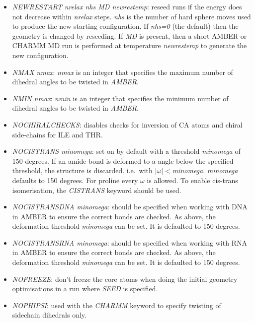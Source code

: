 \documentclass[12pt,a4paper,dvips]{article}
\begin{document}
\begin{itemize}
\item {\it NEWRESTART nrelax nhs MD newrestemp\/}: reseed runs if the energy does not decrease within {\it nrelax} steps.
{\it nhs} is the number of hard sphere moves used to produce the new starting configuration.
If {\it nhs=0} (the default) then the geometry is changed by reseeding. If {\it MD} is present, then a short AMBER or CHARMM MD run is performed at temperature {\it newrestemp} to generate the new configuration.

\item {\it NMAX nmax\/}: {\it nmax\/} is an integer that specifies the maximum number of dihedral angles
to be twisted in {\it AMBER\/}.

\item {\it NMIN nmax\/}: {\it nmin\/} is an integer that specifies the minimum number of dihedral angles
to be twisted in {\it AMBER\/}.

\item {\it NOCHIRALCHECKS\/}: disables checks for inversion of CA atoms and chiral side-chains for ILE and THR.

\item {\it NOCISTRANS minomega\/}: set on by default with a threshold {\it minomega} of 150 degrees.  
If an amide bond is deformed to a angle below the specified threshold, the structure is discarded. 
i.e.~with $|\omega|<${\it minomega}. {\it minomega\/} defaults to 150 degrees. 
For proline every $\omega$ is allowed. To enable cis-trans isomerisation, the {\it CISTRANS} keyword should be used. 

\item {\it NOCISTRANSDNA minomega\/}: should be specified when working with DNA in AMBER to ensure the correct bonds are 
checked. As above, the deformation threshold {\it minomega} can be set. It is defaulted to 150 degrees.

\item {\it NOCISTRANSRNA minomega\/}: should be specified when working with RNA in AMBER to ensure the correct bonds are 
checked. As above, the deformation threshold {\it minomega} can be set. It is defaulted to 150 degrees.

\item {\it NOFREEZE\/}: don't freeze the core atoms when doing the initial geometry optimisations in 
a run where {\it SEED\/} is specified.

\item{\it NOPHIPSI}: used with the {\it CHARMM} keyword to specify twisting of 
sidechain dihedrals only.


\end{itemize}
\end{document}
